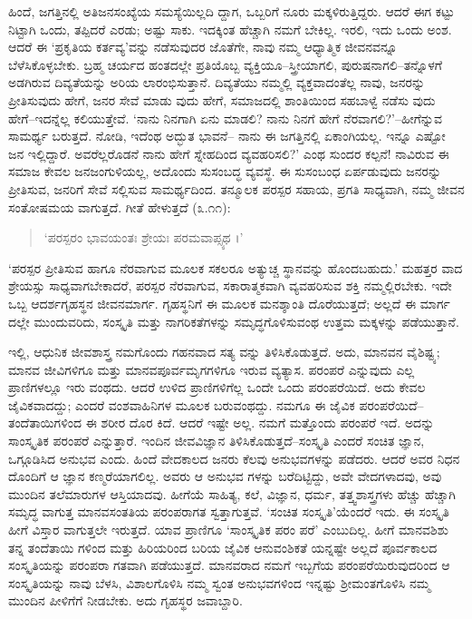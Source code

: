 ಹಿಂದೆ, ಜಗತ್ತಿನಲ್ಲಿ ಅತಿಜನಸಂಖ್ಯೆಯ ಸಮಸ್ಯೆಯಿಲ್ಲದಿ ದ್ದಾಗ, ಒಬ್ಬರಿಗೆ ನೂರು ಮಕ್ಕಳಿರುತ್ತಿದ್ದರು. ಆದರೆ ಈಗ ಕಟ್ಟು ನಿಟ್ಟಾಗಿ ಒಂದು, ತಪ್ಪಿದರೆ ಎರಡು; ಅಷ್ಟು ಸಾಕು. ಇದಕ್ಕಿಂತ ಹೆಚ್ಚಾಗಿ ನಮಗೆ ಬೇಕಿಲ್ಲ. ಇರಲಿ, ಇದು ಒಂದು ಅಂಶ. ಆದರೆ ಈ ‘ಪ್ರಕೃತಿಯ ಕರ್ತವ್ಯ’ವನ್ನು ನಡೆಸುವುದರ ಜೊತೆಗೇ, ನಾವು ನಮ್ಮ ಆಧ್ಯಾತ್ಮಿಕ ಜೀವನವನ್ನೂ ಬೆಳೆಸಿಕೊಳ್ಳಬೇಕು. ಬ್ರಹ್ಮ ಚರ್ಯದ ಹಂತದಲ್ಲೇ ಪ್ರತಿಯೊಬ್ಬ ವ್ಯಕ್ತಿಯೂ–ಸ್ತ್ರೀಯಾಗಲಿ, ಪುರುಷನಾಗಲಿ–ತನ್ನೊಳಗೆ ಅಡಗಿರುವ ದಿವ್ಯತೆಯನ್ನು ಅರಿಯ ಲಾರಂಭಿಸುತ್ತಾನೆ. ದಿವ್ಯತೆಯು ನಮ್ಮಲ್ಲಿ ವ್ಯಕ್ತವಾದಂತೆಲ್ಲ ನಾವು, ಜನರನ್ನು ಪ್ರೀತಿಸುವುದು ಹೇಗೆ, ಜನರ ಸೇವೆ ಮಾಡು ವುದು ಹೇಗೆ, ಸಮಾಜದಲ್ಲಿ ಶಾಂತಿಯಿಂದ ಸಹಬಾಳ್ವೆ ನಡೆಸು ವುದು ಹೇಗೆ–ಇದನ್ನೆಲ್ಲ ಕಲಿಯುತ್ತೇವೆ. ‘ನಾನು ನಿನಗಾಗಿ ಏನು ಮಾಡಲಿ? ನಾನು ನಿನಗೆ ಹೇಗೆ ನೆರವಾಗಲಿ?’–ಹೀಗೆನ್ನುವ ಸಾಮರ್ಥ್ಯ ಬರುತ್ತದೆ. ನೋಡಿ, ಇದೆಂಥ ಅದ್ಭುತ ಭಾವನೆ– ನಾನು ಈ ಜಗತ್ತಿನಲ್ಲಿ ಏಕಾಂಗಿಯಲ್ಲ. ಇನ್ನೂ ಎಷ್ಟೋ ಜನ ಇಲ್ಲಿದ್ದಾರೆ. ಅವರೆಲ್ಲರೊಡನೆ ನಾನು ಹೇಗೆ ಸ್ನೇಹದಿಂದ ವ್ಯವಹರಿಸಲಿ?’ ಎಂಥ ಸುಂದರ ಕಲ್ಪನೆ! ನಾವಿರುವ ಈ ಸಮಾಜ ಕೇವಲ ಜನಜಂಗುಳಿಯಲ್ಲ, ಅದೊಂದು ಸುಸಂಬದ್ಧ ವ್ಯವಸ್ಥೆ. ಈ ಸುಸಂಬಂಧ ಏರ್ಪಡುವುದು ಜನರನ್ನು ಪ್ರೀತಿಸುವ, ಜನರಿಗೆ ಸೇವೆ ಸಲ್ಲಿಸುವ ಸಾಮರ್ಥ್ಯದಿಂದ. ತನ್ಮೂಲಕ ಪರಸ್ಪರ ಸಹಾಯ, ಪ್ರಗತಿ ಸಾಧ್ಯವಾಗಿ, ನಮ್ಮ ಜೀವನ ಸಂತೋಷಮಯ ವಾಗುತ್ತದೆ. ಗೀತೆ ಹೇಳುತ್ತದೆ (೩.೧೧):

\begin{verse}
‘ಪರಸ್ಪರಂ ಭಾವಯಂತಃ ಶ್ರೇಯಃ ಪರಮವಾಪ್ಸ್ಯಥ ।’
\end{verse}

‘ಪರಸ್ಪರ ಪ್ರೀತಿಸುವ ಹಾಗೂ ನೆರವಾಗುವ ಮೂಲಕ ಸಕಲರೂ ಅತ್ಯುಚ್ಚ ಸ್ಥಾನವನ್ನು ಹೊಂದಬಹುದು.’ ಮಹತ್ತರ ವಾದ ಶ್ರೇಯಸ್ಸು ಸಾಧ್ಯವಾಗಬೇಕಾದರೆ, ಪರಸ್ಪರ ನೆರವಾಗುವ, ಸಕಾರಾತ್ಮಕವಾಗಿ ವ್ಯವಹರಿಸುವ ಶಕ್ತಿ ನಮ್ಮಲ್ಲಿರಬೇಕು. ಇದೇ ಒಬ್ಬ ಆದರ್ಶಗೃಹಸ್ಥನ ಜೀವನಮಾರ್ಗ. ಗೃಹಸ್ಥನಿಗೆ ಈ ಮೂಲಕ ಮನಶ್ಶಾಂತಿ ದೊರೆಯುತ್ತದೆ; ಅಲ್ಲದೆ ಈ ಮಾರ್ಗ ದಲ್ಲೇ ಮುಂದುವರಿದು, ಸಂಸ್ಕೃತಿ ಮತ್ತು ನಾಗರಿಕತೆಗಳನ್ನು ಸಮೃದ್ಧಗೊಳಿಸುವಂಥ ಉತ್ತಮ ಮಕ್ಕಳನ್ನು ಪಡೆಯುತ್ತಾನೆ.

ಇಲ್ಲಿ, ಆಧುನಿಕ ಜೀವಶಾಸ್ತ್ರ ನಮಗೊಂದು ಗಹನವಾದ ಸತ್ಯ ವನ್ನು ತಿಳಿಸಿಕೊಡುತ್ತದೆ. ಅದು, ಮಾನವನ ವೈಶಿಷ್ಟ್ಯ; ಮಾನವ ಜೀವಿಗಳಿಗೂ ಮತ್ತು ಮಾನವಪೂರ್ವಮೃಗಗಳಿಗೂ ಇರುವ ವ್ಯತ್ಯಾಸ. ಪರಂಪರೆ ಎನ್ನುವುದು ಎಲ್ಲ ಪ್ರಾಣಿಗಳಲ್ಲೂ ಇರು ವಂಥದು. ಆದರೆ ಉಳಿದ ಪ್ರಾಣಿಗಳಿಗೆಲ್ಲ ಒಂದೇ ಒಂದು ಪರಂಪರೆಯಿದೆ. ಅದು ಕೇವಲ ಜೈವಿಕವಾದದ್ದು; ಎಂದರೆ ವಂಶವಾಹಿನಿಗಳ ಮೂಲಕ ಬರುವಂಥದ್ದು. ನಮಗೂ ಈ ಜೈವಿಕ ಪರಂಪರೆಯಿದೆ–ತಂದೆತಾಯಿಗಳಿಂದ ಈ ಶರೀರ ದೊರ ಕಿದೆ. ಆದರೆ ಇಷ್ಟೇ ಅಲ್ಲ. ನಮಗೆ ಮತ್ತೊಂದು ಪರಂಪರೆ ಇದೆ. ಅದನ್ನು ಸಾಂಸ್ಕೃತಿಕ ಪರಂಪರೆ ಎನ್ನುತ್ತಾರೆ. ಇಂದಿನ ಜೀವವಿಜ್ಞಾನ ತಿಳಿಸಿಕೊಡುತ್ತದೆ–ಸಂಸ್ಕೃತಿ ಎಂದರೆ ಸಂಚಿತ ಜ್ಞಾನ, ಒಗ್ಗೂಡಿಸಿದ ಅನುಭವ ಎಂದು. ಹಿಂದೆ ವೇದಕಾಲದ ಜನರು ಕೆಲವು ಅನುಭವಗಳನ್ನು ಪಡೆದರು. ಆದರೆ ಅವರ ನಿಧನ ದೊಂದಿಗೆ ಆ ಜ್ಞಾನ ಕಣ್ಮರೆಯಾಗಲಿಲ್ಲ. ಅವರು ಆ ಅನುಭವ ಗಳನ್ನು ಬರೆದಿಟ್ಟಿದ್ದು, ಅವೇ ವೇದಗಳಾದವು, ಅವು ಮುಂದಿನ ತಲೆಮಾರುಗಳ ಆಸ್ತಿಯಾದವು. ಹೀಗೆಯೆ ಸಾಹಿತ್ಯ, ಕಲೆ, ವಿಜ್ಞಾನ, ಧರ್ಮ, ತತ್ತ್ವಶಾಸ್ತ್ರಗಳು ಹೆಚ್ಚು ಹೆಚ್ಚಾಗಿ ಸಮೃದ್ಧ ವಾಗುತ್ತ ಮಾನವಸಂತತಿಯ ಪರಂಪರಾಗತ ಸ್ವತ್ತಾಗುತ್ತವೆ. ‘ಸಂಚಿತ ಸಂಸ್ಕೃತಿ’ಯೆಂದರೆ ಇದು. ಈ ಸಂಸ್ಕೃತಿ ಹೀಗೆ ವಿಸ್ತಾರ ವಾಗುತ್ತಲೇ ಇರುತ್ತದೆ. ಯಾವ ಪ್ರಾಣಿಗೂ ‘ಸಾಂಸ್ಕೃತಿಕ ಪರಂ ಪರೆ’ ಎಂಬುದಿಲ್ಲ. ಹೀಗೆ ಮಾನವಶಿಶು ತನ್ನ ತಂದೆತಾಯಿ ಗಳಿಂದ ಮತ್ತು ಹಿರಿಯರಿಂದ ಬರಿಯ ಜೈವಿಕ ಆನುವಂಶಿಕತೆ ಯನ್ನಷ್ಟೇ ಅಲ್ಲದೆ ಪೂರ್ವಕಾಲದ ಸಂಸ್ಕೃತಿಯನ್ನು ಪರಂಪರಾ ಗತವಾಗಿ ಪಡೆಯುತ್ತದೆ. ಮಾನವರಾದ ನಮಗೆ ಇಬ್ಬಗೆಯ ಪರಂಪರೆಯಿರುವುದರಿಂದ ಆ ಸಂಸ್ಕೃತಿಯನ್ನು ನಾವು ಬೆಳಸಿ, ವಿಶಾಲಗೊಳಿಸಿ ನಮ್ಮ ಸ್ವಂತ ಅನುಭವಗಳಿಂದ ಇನ್ನಷ್ಟು ಶ್ರೀಮಂತಗೊಳಿಸಿ ನಮ್ಮ ಮುಂದಿನ ಪೀಳಿಗೆಗೆ ನೀಡಬೇಕು. ಅದು ಗೃಹಸ್ಥರ ಜವಾಬ್ದಾರಿ.

